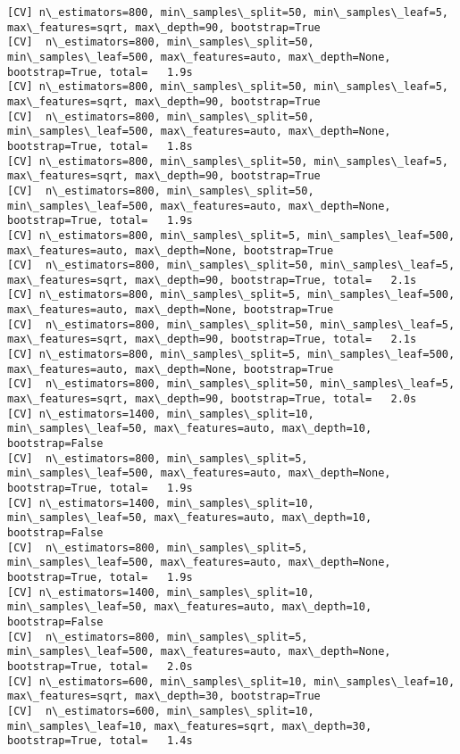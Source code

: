 \documentclass[11pt]{article}
\begin{document}
\begin{Verbatim}[commandchars=\\\{\}]
[CV] n\_estimators=800, min\_samples\_split=50, min\_samples\_leaf=5, max\_features=sqrt, max\_depth=90, bootstrap=True 
[CV]  n\_estimators=800, min\_samples\_split=50, min\_samples\_leaf=500, max\_features=auto, max\_depth=None, bootstrap=True, total=   1.9s
[CV] n\_estimators=800, min\_samples\_split=50, min\_samples\_leaf=5, max\_features=sqrt, max\_depth=90, bootstrap=True 
[CV]  n\_estimators=800, min\_samples\_split=50, min\_samples\_leaf=500, max\_features=auto, max\_depth=None, bootstrap=True, total=   1.8s
[CV] n\_estimators=800, min\_samples\_split=50, min\_samples\_leaf=5, max\_features=sqrt, max\_depth=90, bootstrap=True 
[CV]  n\_estimators=800, min\_samples\_split=50, min\_samples\_leaf=500, max\_features=auto, max\_depth=None, bootstrap=True, total=   1.9s
[CV] n\_estimators=800, min\_samples\_split=5, min\_samples\_leaf=500, max\_features=auto, max\_depth=None, bootstrap=True 
[CV]  n\_estimators=800, min\_samples\_split=50, min\_samples\_leaf=5, max\_features=sqrt, max\_depth=90, bootstrap=True, total=   2.1s
[CV] n\_estimators=800, min\_samples\_split=5, min\_samples\_leaf=500, max\_features=auto, max\_depth=None, bootstrap=True 
[CV]  n\_estimators=800, min\_samples\_split=50, min\_samples\_leaf=5, max\_features=sqrt, max\_depth=90, bootstrap=True, total=   2.1s
[CV] n\_estimators=800, min\_samples\_split=5, min\_samples\_leaf=500, max\_features=auto, max\_depth=None, bootstrap=True 
[CV]  n\_estimators=800, min\_samples\_split=50, min\_samples\_leaf=5, max\_features=sqrt, max\_depth=90, bootstrap=True, total=   2.0s
[CV] n\_estimators=1400, min\_samples\_split=10, min\_samples\_leaf=50, max\_features=auto, max\_depth=10, bootstrap=False 
[CV]  n\_estimators=800, min\_samples\_split=5, min\_samples\_leaf=500, max\_features=auto, max\_depth=None, bootstrap=True, total=   1.9s
[CV] n\_estimators=1400, min\_samples\_split=10, min\_samples\_leaf=50, max\_features=auto, max\_depth=10, bootstrap=False 
[CV]  n\_estimators=800, min\_samples\_split=5, min\_samples\_leaf=500, max\_features=auto, max\_depth=None, bootstrap=True, total=   1.9s
[CV] n\_estimators=1400, min\_samples\_split=10, min\_samples\_leaf=50, max\_features=auto, max\_depth=10, bootstrap=False 
[CV]  n\_estimators=800, min\_samples\_split=5, min\_samples\_leaf=500, max\_features=auto, max\_depth=None, bootstrap=True, total=   2.0s
[CV] n\_estimators=600, min\_samples\_split=10, min\_samples\_leaf=10, max\_features=sqrt, max\_depth=30, bootstrap=True 
[CV]  n\_estimators=600, min\_samples\_split=10, min\_samples\_leaf=10, max\_features=sqrt, max\_depth=30, bootstrap=True, total=   1.4s

\end{Verbatim}
\end{document}
